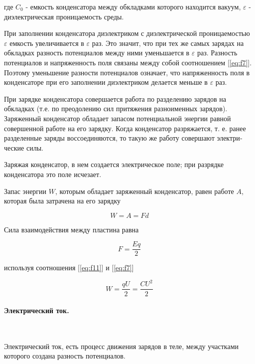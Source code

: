 \documentclass[a4paper,12pt]{article}
\begin{document}
		где $C_0$ - емкость конденсатора между обкладками которого находится вакуум,
		$\varepsilon$ - диэлектрическая проницаемость среды.

		При за­полнении конденсатора диэлектриком с диэлектрической проницаемостью $\varepsilon$
		емкость увеличивается в $\varepsilon$ раз. Это зна­чит, что при тех же самых зарядах на 
		обкладках разность потенциалов между ними уменьшается в $\varepsilon$ раз. Разность 
		потенциалов и напряженность поля связаны между собой соотношением [\ref{eq:f7}]. Поэтому 
		уменьшение разности потен­циалов означает, что напряженность поля в конденсаторе при его 
		заполнении диэлектриком делается меньше в $\varepsilon$ раз.

		При зарядке конденсатора совершается работа по разделению зарядов на обкладках (т.е.
		по преодолению сил притяжения разноименных зарядов). Заряженный конденсатор обладает
		запасом потенциальной энергии равной совершенной работе на его зарядку. Когда 
		конденсатор разряжается, т. е. ранее разделенные заряды воссоединяются, то такую же 
		работу совершают электри­ческие силы.

		Заряжая конден­сатор, в нем создается электрическое поле; при разрядке конденсатора это 
		поле исчезает.
		
		Запас энергии $W$, которым обладает заряженный конденсатор, равен работе $A$, которая
		была затрачена на его зарядку

		\begin{equation}
			W = A = Fd
		\end{equation}

		Сила взаимодействия между пластина равна

		\begin{equation}
			F = \frac{Eq}{2}
			\label{eq:f11}
		\end{equation}

		используя соотношения [\ref{eq:f11}] и [\ref{eq:f7}]

		\begin{equation}
			W = \frac{qU}{2} = \frac{CU^2}{2} 
		\end{equation}


		\paragraph{Электрический ток.} \

		Электрический ток, есть процесс движения зарядов в те­ле, между участками которого 
		создана разность потенциа­лов.
\end{document}
